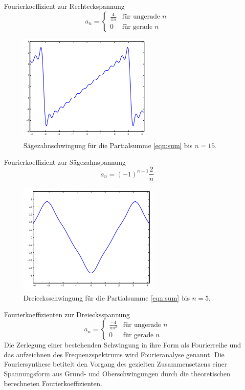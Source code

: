 Fourierkoeffizient zur Rechteckspannung
\begin{equation}
  a_n =
  \begin{cases}
      \frac{4}{\pi n} & \text{für ungerade } n\\
      0 & \text{für gerade } n
  \end{cases}
\end{equation}
\begin{figure}[H]
  \centering
  \includegraphics{content/images/saege_theo_n=15.png}
  \caption{Sägezahnschwingung für die Partialsumme \eqref{eqn:sum} bis $n=15$\cite{koeff}.}
  \label{fig:saege_theo}
\end{figure}
Fourierkoeffizient zur Sägezahnspannung
\begin{equation}
  a_n = (-1)^{n+1}\frac{2}{n}
\end{equation}
\begin{figure}[H]
  \centering
  \includegraphics{content/images/dreieck_theo_n=5.png}
  \caption{Dreiecksschwingung für die Partialsumme \eqref{eqn:sum} bis $n=5$\cite{koeff}.}
  \label{fig:dreieck_theo}
\end{figure}
Fourierkoeffizienten zur Dreiecksspannung
\begin{equation}
  a_n =
  \begin{cases}
    \frac{-4}{\pi n^2} & \text{für ungerade }n\\
    0 & \text{für gerade }n
  \end{cases}
\end{equation}
Die Zerlegung einer bestehenden Schwingung in ihre Form als Fourierreihe
und das aufzeichnen des Frequenzspektrums wird Fourieranalyse genannt.
Die Fouriersynthese betitelt den Vorgang des gezielten Zusammensetzens
einer Spannungsform aus Grund- und Oberschwingungen durch die theoretischen
berechneten Fourierkoeffizienten.
